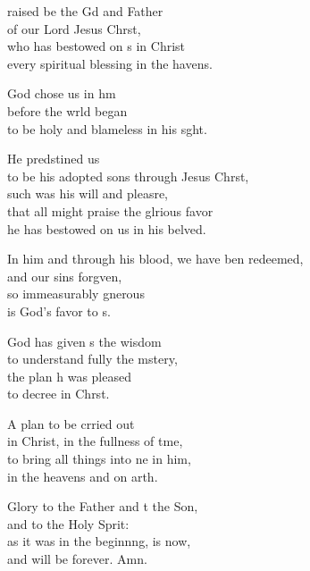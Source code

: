 \settowidth{\versewidth}{In him and through his blood, we have been redeemed, *}
\begin{psalmverse}%
  \begin{patverse}
    raised be the Gd and Father\Med\\
    of our Lord Jesus Chr\pointup{\i}st,\\
    who has bestowed on s in Christ\Med\\
    every spiritual blessing in the havens.
    
    God chose us in h\pointup{\i}m\Flex\\
    before the wrld began\Med\\
    to be holy and blameless in his s\pointup{\i}ght.
    
    He predstined us\Med\\
    to be his adopted sons through Jesus Chr\pointup{\i}st,\Med\\
    such was his will and pleasre,\Flex\\
    that all might praise the glrious favor\Med\\
    he has bestowed on us in his belved.
    
    In him and through his blood, we have ben redeemed,\Med\\
    and our sins forg\pointup{\i}ven,\\
    so immeasurably gnerous\Med\\
    is God’s favor to s.
    
    God has given s the wisdom\Med\\
    to understand fully the mstery,\\
    the plan h was pleased\Med\\
    to decree in Chr\pointup{\i}st.
    
    A plan to be crried out\Med\\
    in Christ, in the fullness of t\pointup{\i}me,\\
    to bring all things into ne in him,\Med\\
    in the heavens and on arth.
    
    Glory to the Father and t the Son,\Med\\
    and to the Holy Sp\pointup{\i}rit:\\
    as it was in the beginn\pointup{\i}ng, is now,\Med\\
    and will be forever. Amn.
  \end{patverse}
\end{psalmverse}
